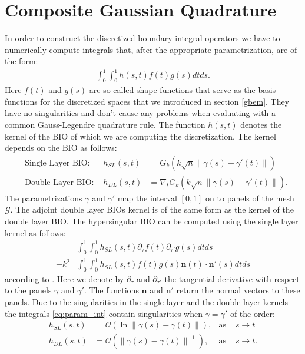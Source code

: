 \documentclass[a4paper, oneside]{discothesis}
\begin{document}
\section{Composite Gaussian Quadrature} \label{cg}
In order to construct the discretized boundary integral operators we have to numerically compute integrals that, after the appropriate parametrization, are of the form:
\begin{align}
	\int_{0}^{1}\int_{0}^{1} h(s,t)f(t)g(s)dtds. \label{eq:param_int}
\end{align}
Here $f(t)$ and $g(s)$ are so called shape functions that serve as the basis functions for the discretized spaces that we introduced in section \ref{gbem}.
They have no singularities and don't cause any problems when evaluating with a common Gauss-Legendre quadrature rule.
The function $h(s,t)$ denotes the kernel of the BIO of which we are computing the discretization. 
The kernel depends on the BIO as follows:
\begin{align}
	&\text{Single Layer BIO: } &h_{SL}(s,t) &= G_k(k\sqrt{n}\|\gamma(s)-\gamma'(t)\|) \\
	&\text{Double Layer BIO: } &h_{DL}(s,t) &= \nabla_tG_k(k\sqrt{n}\|\gamma(s)-\gamma'(t)\|).
\end{align}
The parametrizations $\gamma$ and $\gamma'$ map the interval $[0,1]$ on to panels of the mesh $\mathcal{G}$.
The adjoint double layer BIOs kernel is of the same form as the kernel of the double layer BIO.
The hypersingular BIO can be computed using the single layer kernel as follows:
\begin{align}
	&\int_{0}^{1}\int_{0}^{1} h_{SL}(s,t) \partial_{\tau} f(t) \partial_{\tau'}  g(s)dtds\\
	-k^2&\int_{0}^{1}\int_{0}^{1} h_{SL}(s,t)f(t)g(s)\mathbf{n}(t)\cdot\mathbf{n'}(s)dtds
\end{align}
according to \cite{McLean2002StronglyES}. 
Here we denote by $\partial_{\tau}$ and $\partial_{\tau'}$ the tangential derivative with respect to the panels $\gamma$ and $\gamma'$.
The functions $\mathbf{n}$ and $\mathbf{n'}$ return the normal vectors to these panels.
Due to the singularities in the single layer and the double layer kernels the integrals \ref{eq:param_int} contain singularities when $\gamma=\gamma'$ of the order:
\begin{align}
	h_{SL}(s,t) &=	\mathcal{O}(\ln\|\gamma(s)-\gamma(t)\|), &\text{as } &s \rightarrow t\\
	h_{DL}(s,t) &= \mathcal{O}(\|\gamma(s)-\gamma(t)\|^{-1}), &\text{as } &s \rightarrow t.
\end{align}
\end{document}
